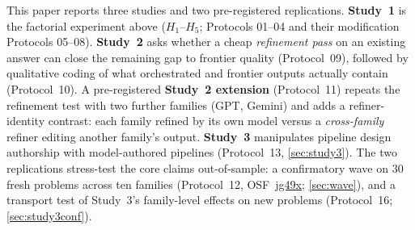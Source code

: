 \documentclass[12pt,a4paper]{article}
\begin{document}
This paper reports three studies and two pre-registered replications.
\textbf{Study~1} is the factorial experiment above ($H_1$--$H_5$; Protocols
01--04 and their modification Protocols 05--08). \textbf{Study~2} asks whether a cheap
\emph{refinement pass} on an existing answer can close the remaining gap to
frontier quality (Protocol~09), followed by qualitative coding of what
orchestrated and frontier outputs actually contain (Protocol~10). A
pre-registered \textbf{Study~2 extension} (Protocol~11) repeats the refinement
test with two further families (GPT, Gemini) and adds a refiner-identity
contrast: each family refined by its own model versus a \emph{cross-family}
refiner editing another family's output. \textbf{Study~3}
manipulates pipeline design authorship with model-authored pipelines
(Protocol~13, \cref{sec:study3}). The two replications stress-test the core
claims out-of-sample: a confirmatory wave on 30 fresh problems across ten
families (Protocol~12, OSF~\href{https://osf.io/jg49x}{jg49x};
\cref{sec:wave}), and a transport test of Study~3's family-level effects on
new problems (Protocol~16; \cref{sec:study3conf}).
\end{document}
